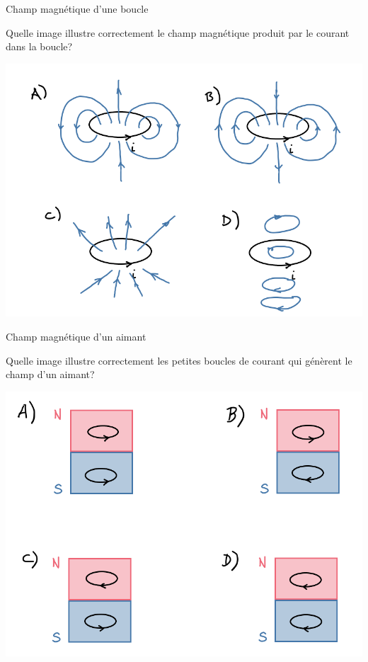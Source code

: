 \documentclass{beamer}
\begin{document}
\begin{frame}[t]{Champ magnétique d'une boucle}
  
  Quelle image illustre correctement le champ magnétique produit par le courant
  dans la boucle?

  \begin{center}
    \includegraphics[scale=0.4]{figures/champ_boucle_ex2.png}
  \end{center}

\end{frame}


\begin{frame}[t]{Champ magnétique d'un aimant}
  
  Quelle image illustre correctement les petites boucles de courant qui
  génèrent le champ d'un aimant?

  \begin{center}
    \includegraphics[scale=0.4]{figures/aimant_boucle.png}
  \end{center}

\end{frame}
\end{document}
